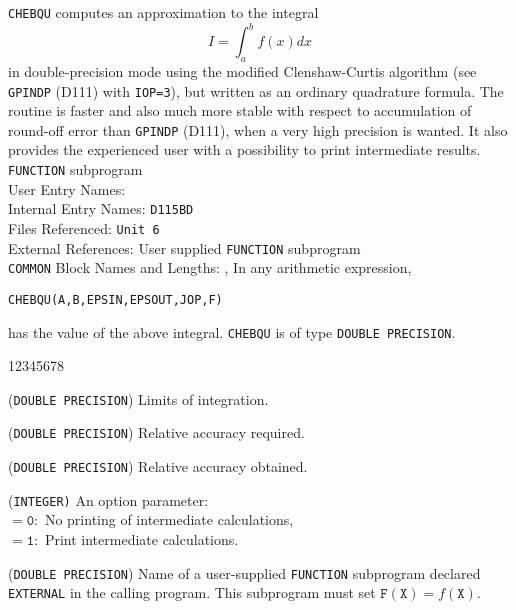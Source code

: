                                   
                                 
\Submitter{}                                       
                         
{\tt CHEBQU} computes an approximation to the integral
        $$ I=\int_a^b f(x)dx $$
in double-precision mode using the modified Clenshaw-Curtis algorithm
(see {\tt GPINDP} (D111) with {\tt IOP=3}),
but written as an ordinary quadrature
formula. The routine is faster and also much more stable with respect
to accumulation of round-off error than {\tt GPINDP} (D111),
when a very high precision is wanted. It also provides the experienced
user with a possibility to print intermediate results.
\Structure
{\tt FUNCTION} subprogram \\
User Entry Names:   \\
Internal Entry Names:  {\tt D115BD}\\
Files Referenced: {\tt Unit 6}\\
External  References: User supplied {\tt FUNCTION} subprogram \\
{\tt COMMON} Block Names and Lengths:
, 
\Usage
In any arithmetic expression,
\begin{center}
{\tt CHEBQU(A,B,EPSIN,EPSOUT,JOP,F)}
\end{center}
has the value of the above integral. {\tt CHEBQU} is of type
{\tt DOUBLE PRECISION}.
\begin{DLtt}{12345678}
\item [A,B] ({\tt DOUBLE PRECISION}) Limits of integration.
\item [EPSIN] ({\tt DOUBLE PRECISION}) Relative accuracy required.
\item [EPSOUT] ({\tt DOUBLE PRECISION}) Relative accuracy obtained.
\item [JOP] ({\tt INTEGER)} An option parameter: \\
$\mathtt{= 0:}$ No printing of intermediate calculations, \\
$\mathtt{= 1:}$ Print intermediate calculations.
\item[F] ({\tt DOUBLE PRECISION}) Name of a user-supplied {\tt FUNCTION}
subprogram declared {\tt EXTERNAL} in the calling program. This
subprogram must set $\mathtt{F(X)} = f(\mathtt{X})$.
\end{DLtt}
